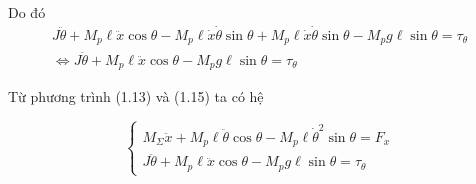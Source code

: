             Do đó
            \begin{align}
                J \ddot{\theta} + M_p \ell \ddot{x} \cos \theta - M_p \ell \dot{x} \dot{\theta} \sin \theta + M_p \ell \dot{x} \dot{\theta} \sin \theta - M_p g \ell \sin \theta = \tau_\theta \nonumber\\
                \Leftrightarrow J \ddot{\theta} + M_p \ell \ddot{x} \cos \theta - M_p g \ell \sin \theta = \tau_\theta
            \end{align}

            Từ phương trình (1.13) và (1.15) ta có hệ 

            \begin{equation}
                \begin{cases}
                    M_{\Sigma} \ddot{x} + M_p \ell \ddot{\theta} \cos \theta - M_p \ell \dot{\theta}^2 \sin \theta = F_x \\
                    J \ddot{\theta} + M_p \ell \ddot{x} \cos \theta - M_p g \ell \sin \theta = \tau_\theta
                \end{cases}
            \end{equation}

